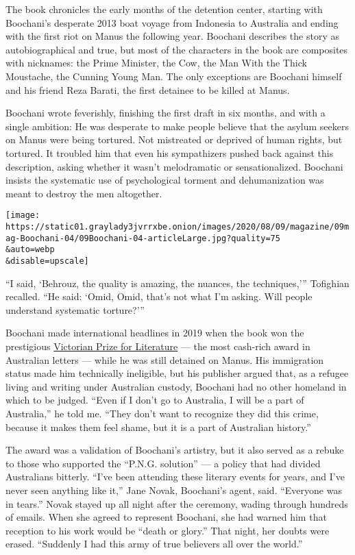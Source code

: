 The book chronicles the early months of the detention center, starting
with Boochani's desperate 2013 boat voyage from Indonesia to Australia
and ending with the first riot on Manus the following year. Boochani
describes the story as autobiographical and true, but most of the
characters in the book are composites with nicknames: the Prime
Minister, the Cow, the Man With the Thick Moustache, the Cunning Young
Man. The only exceptions are Boochani himself and his friend Reza
Barati, the first detainee to be killed at Manus.

Boochani wrote feverishly, finishing the first draft in six months, and
with a single ambition: He was desperate to make people believe that the
asylum seekers on Manus were being tortured. Not mistreated or deprived
of human rights, but tortured. It troubled him that even his
sympathizers pushed back against this description, asking whether it
wasn't melodramatic or sensationalized. Boochani insists the systematic
use of psychological torment and dehumanization was meant to destroy the
men altogether.

\texttt{[image: https://static01.graylady3jvrrxbe.onion/images/2020/08/09/magazine/09mag-Boochani-04/09Boochani-04-articleLarge.jpg?quality=75\\\&auto=webp\\\&disable=upscale]}

``I said, `Behrouz, the quality is amazing, the nuances, the
techniques,''' Tofighian recalled. ``He said: `Omid, Omid, that's not
what I'm asking. Will people understand systematic torture?'''

Boochani made international headlines in 2019 when the book won the
prestigious
\href{https://www.nytimes3xbfgragh.onion/2019/01/31/world/australia/behrouz-boochani-victorian-prize-manus-island.html}{Victorian
Prize for Literature} --- the most cash-rich award in Australian letters
--- while he was still detained on Manus. His immigration status made
him technically ineligible, but his publisher argued that, as a refugee
living and writing under Australian custody, Boochani had no other
homeland in which to be judged. ``Even if I don't go to Australia, I
will be a part of Australia,'' he told me. ``They don't want to
recognize they did this crime, because it makes them feel shame, but it
is a part of Australian history.''

The award was a validation of Boochani's artistry, but it also served as
a rebuke to those who supported the ``P.N.G. solution'' --- a policy
that had divided Australians bitterly. ``I've been attending these
literary events for years, and I've never seen anything like it,'' Jane
Novak, Boochani's agent, said. ``Everyone was in tears.'' Novak stayed
up all night after the ceremony, wading through hundreds of emails. When
she agreed to represent Boochani, she had warned him that reception to
his work would be ``death or glory.'' That night, her doubts were
erased. ``Suddenly I had this army of true believers all over the
world.''


